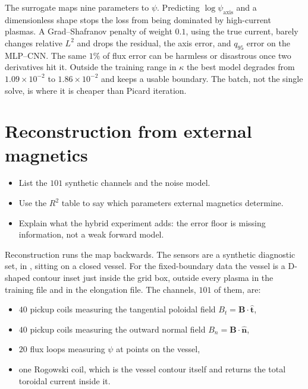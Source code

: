 \documentclass[11pt,a4paper,oneside,openany]{book}
\newcommand{\code}{\path}
\numberwithin{equation}{chapter}
\theoremstyle{definition}
\begin{document}
\begin{keyideas}
The surrogate maps nine parameters to \(\psi\). Predicting \(\log\psi_{\mathrm{axis}}\) and a dimensionless shape stops the loss from being dominated by high-current plasmas. A Grad--Shafranov penalty of weight \(0.1\), using the true current, barely changes relative \(L^{2}\) and drops the residual, the axis error, and \(q_{95}\) error on the MLP--CNN. The same \(1\%\) of flux error can be harmless or disastrous once two derivatives hit it. Outside the training range in \(\kappa\) the best model degrades from \(1.09\times 10^{-2}\) to \(1.86\times 10^{-2}\) and keeps a usable boundary. The batch, not the single solve, is where it is cheaper than Picard iteration.
\end{keyideas}

\chapter{Reconstruction from external magnetics}
\label{ch:inverse}

\begin{objectives}
\begin{itemize}[leftmargin=1.2em]
\item List the \(101\) synthetic channels and the noise model.
\item Use the \(R^{2}\) table to say which parameters external magnetics determine.
\item Explain what the hybrid experiment adds: the error floor is missing information, not a weak forward model.
\end{itemize}
\end{objectives}

Reconstruction runs the map backwards. The sensors are a synthetic diagnostic set, \code{SensorSet} in \code{models/diagnostics.py}, sitting on a closed vessel. For the fixed-boundary data the vessel is a D-shaped contour inset just inside the grid box, outside every plasma in the training file and in the elongation file. The channels, \(101\) of them, are:
\begin{itemize}[leftmargin=1.2em]
\item \(40\) pickup coils measuring the tangential poloidal field \(B_{t}=\mathbf{B}\cdot\hat{\mathbf{t}}\),
\item \(40\) pickup coils measuring the outward normal field \(B_{n}=\mathbf{B}\cdot\hat{\mathbf{n}}\),
\item \(20\) flux loops measuring \(\psi\) at points on the vessel,
\item one Rogowski coil, which is the vessel contour itself and returns the total toroidal current inside it.
\end{itemize}
\end{document}
